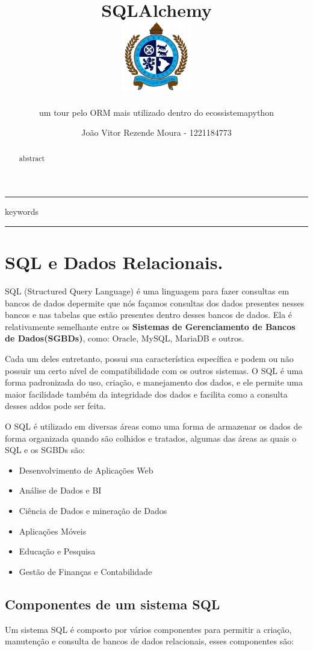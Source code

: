 \documentclass[12pt, a4paper]{paper}
\title{SQLAlchemy\\
  \hfill\includegraphics[height=3cm]{../../../images/universidade.png}
  \vspace{-3cm}
}
\subtitle{um tour pelo ORM mais utilizado dentro do ecossistema\newline python}
\author{João Vitor Rezende Moura - 1221184773}
\begin{document}
\maketitle

\hrule
\begin{abstract}
  abstract
\end{abstract}
\vspace{-0.6cm} %
\begin{keywords}
  keywords
\end{keywords}
\hrule

\section{SQL e Dados Relacionais.} %
\label{sec:SQL e Dados Relacionais.}

SQL (Structured Query Language) é uma linguagem para fazer consultas em bancos de dados
depermite que nós façamos consultas dos dados presentes nesses bancos e nas tabelas 
que estão presentes dentro desses bancos de dados. Ela é relativamente semelhante entre 
os \textbf{Sistemas de Gerenciamento de Bancos de Dados(SGBDs)}, como: Oracle, MySQL, 
MariaDB e outros. 

Cada um deles entretanto, possui sua característica específica e podem ou não possuir 
um certo nível de compatibilidade com os outros sistemas. O SQL é uma forma padronizada 
do uso, criação, e manejamento dos dados, e ele permite uma maior facilidade também da 
integridade dos dados e facilita como a consulta desses addos pode ser feita. 

O SQL é utilizado em diversas áreas como uma forma de armazenar os dados de forma 
organizada quando são colhidos e tratados, algumas das áreas as quais o SQL e os SGBDs 
são: 

\begin{itemize}
  \item Desenvolvimento de Aplicações Web
  \item Análise de Dados e BI 
  \item Ciência de Dados e mineração de Dados 
  \item Aplicações Móveis 
  \item Educação e Pesquisa 
  \item Gestão de Finanças e Contabilidade
\end{itemize}

\subsection{Componentes de um sistema SQL} %
\label{sub:Componentes de um sistema SQL}
Um sistema SQL é composto por vários componentes para permitir a criação, manutenção e 
consulta de bancos de dados relacionais, esses componentes são: 
\end{document}
